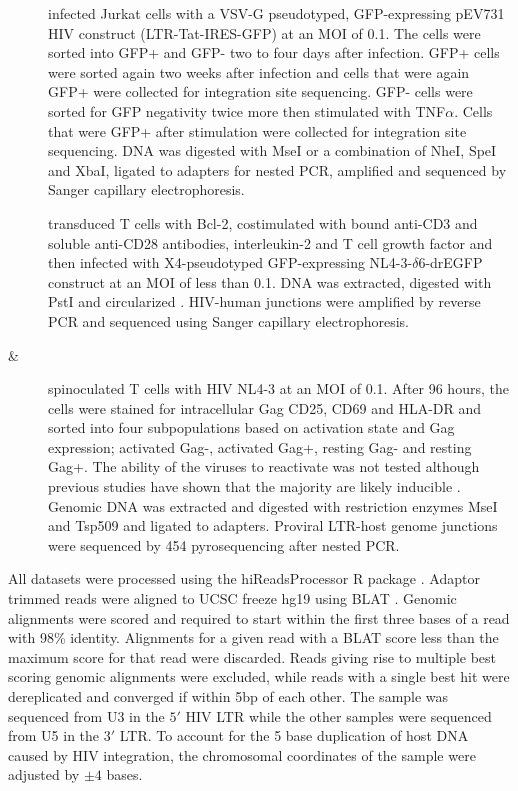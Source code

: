 \documentclass[../sherrill-Mix_thesis.tex]{subfiles}
\begin{document}
	\begin{description}
		\item[\Jurkat{}] \citet{Lewinski2005} infected Jurkat cells with a VSV-G pseudotyped, GFP-expressing pEV731 HIV construct (LTR-Tat-IRES-GFP) \citep{Jordan2001} at an MOI of 0.1. The cells were sorted into GFP+ and GFP- two to four days after infection. GFP+ cells were sorted again two weeks after infection and cells that were again GFP+ were collected for integration site sequencing. GFP- cells were sorted for GFP negativity twice more then stimulated with TNF$\alpha$. Cells that were GFP+ after stimulation were collected for integration site sequencing. DNA was digested with MseI or a combination of NheI, SpeI and XbaI, ligated to adapters for nested PCR, amplified and sequenced by Sanger capillary electrophoresis. 
		\item[\Bcl{}] \citet{Shan2011} transduced \cdFour{} T cells with Bcl-2, costimulated with bound anti-CD3 and soluble anti-CD28 antibodies, interleukin-2 and T cell growth factor and then infected with X4-pseudotyped GFP-expressing NL4-3-$\delta$6-drEGFP construct \citep{Mochizuki1998} at an MOI of less than 0.1. DNA was extracted, digested with PstI and circularized \citep{Han2004}. HIV-human junctions were amplified by reverse PCR and sequenced using Sanger capillary electrophoresis.
		\item[\Active{} \& \Resting{}] \citet{Pace2012} spinoculated \cdFour{} T cells with HIV NL4-3 at an MOI of 0.1. After 96 hours, the cells were stained for intracellular Gag CD25, CD69 and HLA-DR and sorted into four subpopulations based on activation state and Gag expression; activated Gag-, activated Gag+, resting Gag- and resting Gag+. The ability of the viruses to reactivate was not tested although previous studies have shown that the majority are likely inducible \citep{Plesa2007}. Genomic DNA was extracted and digested with restriction enzymes MseI and Tsp509 and ligated to adapters. Proviral LTR-host genome junctions were sequenced by 454 pyrosequencing after nested PCR.
	\end{description}

		All datasets were processed using the hiReadsProcessor R package \citep{Malani}. Adaptor trimmed reads were aligned to UCSC freeze hg19 using BLAT \citep{Kent2002}. Genomic alignments were scored and required to start within the first three bases of a read with 98\% identity. Alignments for a given read with a BLAT score less than the maximum score for that read were discarded.  Reads giving rise to multiple best scoring genomic alignments were excluded, while reads with a single best hit were dereplicated and converged if within 5bp of each other. The \Bcl{} sample was sequenced from U3 in the $5'$ HIV LTR while the other samples were sequenced from U5 in the $3'$ LTR. To account for the 5 base duplication of host DNA caused by HIV integration, the chromosomal coordinates of the \Bcl{} sample were adjusted by $\pm 4$ bases. %
		
\end{document}
